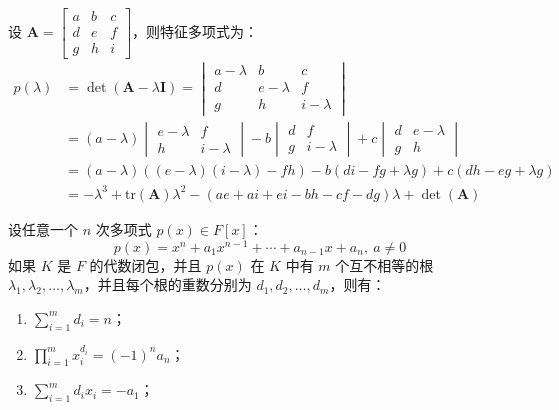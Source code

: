 \begin{example}[三阶方阵的特征多项式展开]
    设 $\mathbf{A} = \begin{bmatrix}
        a & b & c \\
        d & e & f \\
        g & h & i
    \end{bmatrix}$，则特征多项式为：
    \begin{align}
        p(\lambda) &= \det(\mathbf{A} - \lambda \mathbf{I}) = \begin{vmatrix}
            a - \lambda & b & c \\
            d & e - \lambda & f \\
            g & h & i - \lambda
        \end{vmatrix} \\
        &= (a - \lambda) \begin{vmatrix}
            e - \lambda & f \\
            h & i - \lambda
        \end{vmatrix} - b \begin{vmatrix}
            d & f \\
            g & i - \lambda
        \end{vmatrix} + c \begin{vmatrix}
            d & e - \lambda \\
            g & h
        \end{vmatrix} \\
        &= (a - \lambda)((e - \lambda)(i - \lambda) - fh) - b(di - fg + \lambda g) + c(dh - eg + \lambda g) \\
        &= -\lambda^3 + \mathrm{tr}(\mathbf{A})\lambda^2 - (ae + ai + ei - bh - cf - dg)\lambda + \det(\mathbf{A})
        \label{eq:characteristic_polynomial_3x3}
    \end{align}
\end{example}
\vspace{1em}

\begin{theorem}
    设任意一个 $n$ 次多项式 $p(x)\in F[x]$：
    \[
        p(x) = x^n + a_1 x^{n-1} + \cdots + a_{n-1} x + a_n,\ a \neq 0
    \]
    如果 $K$ 是 $F$ 的代数闭包，并且 $p(x)$ 在 $K$ 中有 $m$ 个互不相等的根 $\lambda_1,\lambda_2,\ldots,\lambda_m$，并且每个根的重数分别为 $d_1,d_2,\ldots,d_m$，则有：
    \begin{enumerate}
        \item $\sum_{i=1}^{m} d_i = n$；
        \item $\prod_{i=1}^{m} x_i^{d_i} = (-1)^n a_n$；
        \item $\sum_{i=1}^{m} d_i x_i = -a_1$；
    \end{enumerate}
    \label{thm:VietasTheorem}
\end{theorem}

